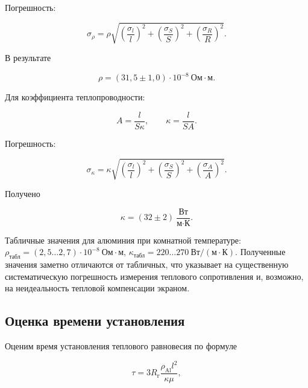 \documentclass[a4paper,12pt]{article}
\begin{document}
Погрешность:

\begin{equation}
    \sigma_{\rho} = \rho \sqrt{
        \left(\frac{\sigma_l}{l}\right)^2 +
        \left(\frac{\sigma_S}{S}\right)^2 +
        \left(\frac{\sigma_R}{R}\right)^2
    }.
\end{equation}

В результате

\begin{equation}
    \rho = (31{,}5 \pm 1{,}0)\cdot 10^{-8}~\text{Ом}\cdot\text{м}.
\end{equation}

Для коэффициента теплопроводности:

\begin{equation}
    A = \frac{l}{S\kappa}, \qquad
    \kappa = \frac{l}{SA}.
\end{equation}

Погрешность:

\begin{equation}
    \sigma_{\kappa} = \kappa \sqrt{
        \left(\frac{\sigma_l}{l}\right)^2 +
        \left(\frac{\sigma_S}{S}\right)^2 +
        \left(\frac{\sigma_A}{A}\right)^2
    }.
\end{equation}

Получено

\begin{equation}
    \kappa = (32 \pm 2)~\frac{\text{Вт}}{\text{м}\cdot\text{К}}.
\end{equation}

Табличные значения для алюминия при комнатной температуре: $\rho_{\text{табл}} = (2{,}5 \ldots 2{,}7)\cdot 10^{-8}~\text{Ом}\cdot\text{м}$, $\kappa_{\text{табл}} = 220 \ldots 270~\text{Вт}/(\text{м}\cdot\text{К})$. Полученные значения заметно отличаются от табличных, что указывает на существенную систематическую погрешность измерения теплового сопротивления и, возможно, на неидеальность тепловой компенсации экраном.

\subsection*{Оценка времени установления}

Оценим время установления теплового равновесия по формуле

\begin{equation}
    \tau = 3R_{\text{г}}\frac{\rho_{\text{Al}} l^2}{\kappa \mu},
\end{equation}
\end{document}
